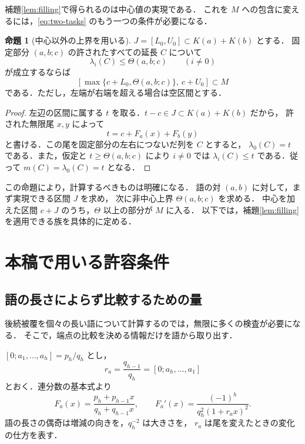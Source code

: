 \documentclass[11pt,a4paper]{article}
\theoremstyle{definition}
\newtheorem{proposition}{命題}
\begin{document}
補題\ref{lem:filling}で得られるのは中心値の実現である．
これを $M$ への包含に変えるには，\eqref{eq:two-tasks} のもう一つの条件が必要になる．

\begin{proposition}[中心以外の上界を用いる]\label{prop:markov}
$J=[L_0,U_0]\subset K(a)+K(b)$ とする．
固定部分 $(a,b;c)$ の許されたすべての延長 $C$ について
\[
 \lambda_i(C)\le\Theta(a,b;c)\qquad(i\ne0)
\]
が成立するならば
\begin{equation}\label{eq:markov-interval}
 [\max\{c+L_0,\Theta(a,b;c)\},\ c+U_0]\subset M
\end{equation}
である．ただし，左端が右端を超える場合は空区間とする．
\end{proposition}
\begin{proof}
左辺の区間に属する $t$ を取る．$t-c\in J\subset K(a)+K(b)$ だから，
許された無限尾 $x,y$ によって
\[
 t=c+F_a(x)+F_b(y)
\]
と書ける．この尾を固定部分の左右につないだ列を $C$ とすると，
$\lambda_0(C)=t$ である．また，仮定と $t\ge\Theta(a,b;c)$ により
$i\ne0$ では $\lambda_i(C)\le t$ である．従って
$m(C)=\lambda_0(C)=t$ となる．
\end{proof}

この命題により，計算するべきものは明確になる．
語の対 $(a,b)$ に対して，まず実現できる区間 $J$ を求め，
次に非中心上界 $\Theta(a,b;c)$ を求める．
中心を加えた区間 $c+J$ のうち，$\Theta$ 以上の部分が $M$ に入る．
以下では，補題\ref{lem:filling}を適用できる族を具体的に定める．

\section{本稿で用いる許容条件}\label{sec:admissibility}

\subsection{語の長さによらず比較するための量}
後続被覆を個々の長い語について計算するのでは，無限に多くの検査が必要になる．
そこで，端点の比較を決める情報だけを語から取り出す．

$[0;a_1,\ldots,a_h]=p_h/q_h$ とし，
\[
 r_a=\frac{q_{h-1}}{q_h}=[0;a_h,\ldots,a_1]
\]
とおく．連分数の基本式より
\begin{equation}\label{eq:mobius}
 F_a(x)=\frac{p_h+p_{h-1}x}{q_h+q_{h-1}x},\qquad
 F_a'(x)=\frac{(-1)^h}{q_h^2(1+r_ax)^2}.
\end{equation}
語の長さの偶奇は増減の向きを，$q_h^{-2}$ は大きさを，
$r_a$ は尾を変えたときの変化の仕方を表す．
\end{document}
